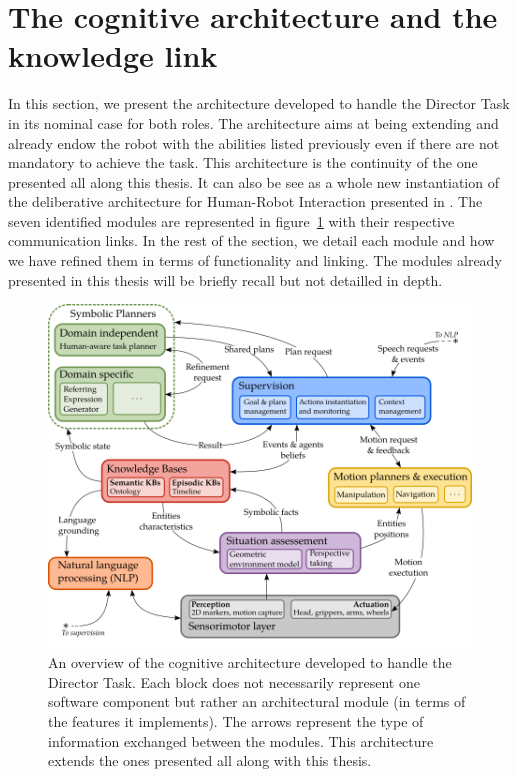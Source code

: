\section[Architecture and knowledge link]{The cognitive architecture and the knowledge link}
\label{sec:9_3}

In this section, we present the architecture developed to handle the Director Task in its nominal case for both roles. The architecture aims at being extending and already endow the robot with the abilities listed previously even if there are not mandatory to achieve the task. This architecture is the continuity of the one presented all along this thesis. It can also be see as a whole new instantiation of the deliberative architecture for Human-Robot Interaction presented in \cite{lemaignan_2017_artificial}. The seven identified modules are represented in figure~\ref{fig:chap9_architecture} with their respective communication links. In the rest of the section, we detail each module and how we have refined them in terms of functionality and linking. The modules already presented in this thesis will be briefly recall but not detailled in depth.

\begin{figure}[ht!]
\centering
\includegraphics[width=\textwidth]{figures/chapter9/architecture.png}
\caption{\label{fig:chap9_architecture} An overview of the cognitive architecture developed to handle the Director Task. Each block does not necessarily represent one software component but rather an architectural module (in terms of the features it implements). The arrows represent the type of information exchanged between the modules. This architecture extends the ones presented all along with this thesis.}
\end{figure}

